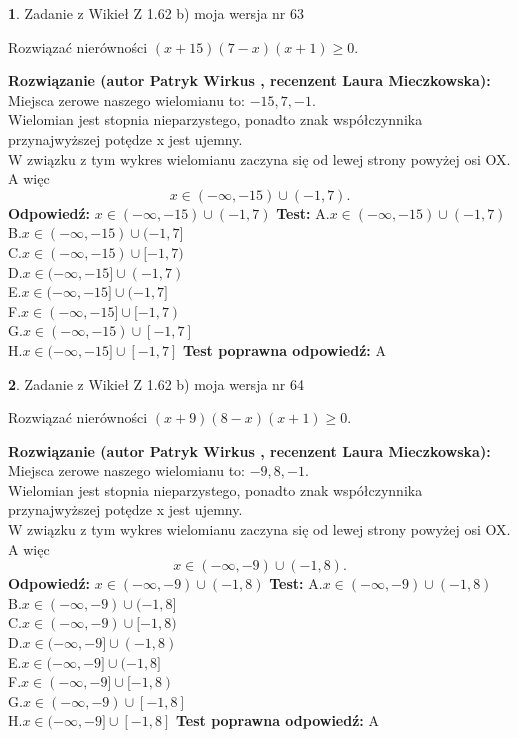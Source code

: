\documentclass[12pt, a4paper]{article}
\theoremstyle{definition} %
\newtheorem{zad}{}
\newcommand{\zadStart}[1]{\begin{zad}#1\newline}
\newcommand{\zadStop}{\end{zad}}
\newcommand{\rozwStart}[2]{\noindent \textbf{Rozwiązanie (autor #1 , recenzent #2): }\newline}
\newcommand{\rozwStop}{\newline}
\newcommand{\odpStart}{\noindent \textbf{Odpowiedź:}\newline}
\newcommand{\odpStop}{\newline}
\newcommand{\testStart}{\noindent \textbf{Test:}\newline}
\newcommand{\testStop}{\newline}
\newcommand{\kluczStart}{\noindent \textbf{Test poprawna odpowiedź:}\newline}
\newcommand{\kluczStop}{\newline}
\begin{document}
\zadStart{Zadanie z Wikieł Z 1.62 b) moja wersja nr 63}

Rozwiązać nierówności $(x+15)(7-x)(x+1)\ge0$.
\zadStop
\rozwStart{Patryk Wirkus}{Laura Mieczkowska}
Miejsca zerowe naszego wielomianu to: $-15, 7, -1$.\\
Wielomian jest stopnia nieparzystego, ponadto znak współczynnika przy\linebreak najwyższej potędze x jest ujemny.\\ W związku z tym wykres wielomianu zaczyna się od lewej strony powyżej osi OX. A więc $$x \in (-\infty,-15) \cup (-1,7).$$
\rozwStop
\odpStart
$x \in (-\infty,-15) \cup (-1,7)$
\odpStop
\testStart
A.$x \in (-\infty,-15) \cup (-1,7)$\\
B.$x \in (-\infty,-15) \cup (-1,7]$\\
C.$x \in (-\infty,-15) \cup [-1,7)$\\
D.$x \in (-\infty,-15] \cup (-1,7)$\\
E.$x \in (-\infty,-15] \cup (-1,7]$\\
F.$x \in (-\infty,-15] \cup [-1,7)$\\
G.$x \in (-\infty,-15) \cup [-1,7]$\\
H.$x \in (-\infty,-15] \cup [-1,7]$
\testStop
\kluczStart
A
\kluczStop



\zadStart{Zadanie z Wikieł Z 1.62 b) moja wersja nr 64}

Rozwiązać nierówności $(x+9)(8-x)(x+1)\ge0$.
\zadStop
\rozwStart{Patryk Wirkus}{Laura Mieczkowska}
Miejsca zerowe naszego wielomianu to: $-9, 8, -1$.\\
Wielomian jest stopnia nieparzystego, ponadto znak współczynnika przy\linebreak najwyższej potędze x jest ujemny.\\ W związku z tym wykres wielomianu zaczyna się od lewej strony powyżej osi OX. A więc $$x \in (-\infty,-9) \cup (-1,8).$$
\rozwStop
\odpStart
$x \in (-\infty,-9) \cup (-1,8)$
\odpStop
\testStart
A.$x \in (-\infty,-9) \cup (-1,8)$\\
B.$x \in (-\infty,-9) \cup (-1,8]$\\
C.$x \in (-\infty,-9) \cup [-1,8)$\\
D.$x \in (-\infty,-9] \cup (-1,8)$\\
E.$x \in (-\infty,-9] \cup (-1,8]$\\
F.$x \in (-\infty,-9] \cup [-1,8)$\\
G.$x \in (-\infty,-9) \cup [-1,8]$\\
H.$x \in (-\infty,-9] \cup [-1,8]$
\testStop
\kluczStart
A
\kluczStop
\end{document}
